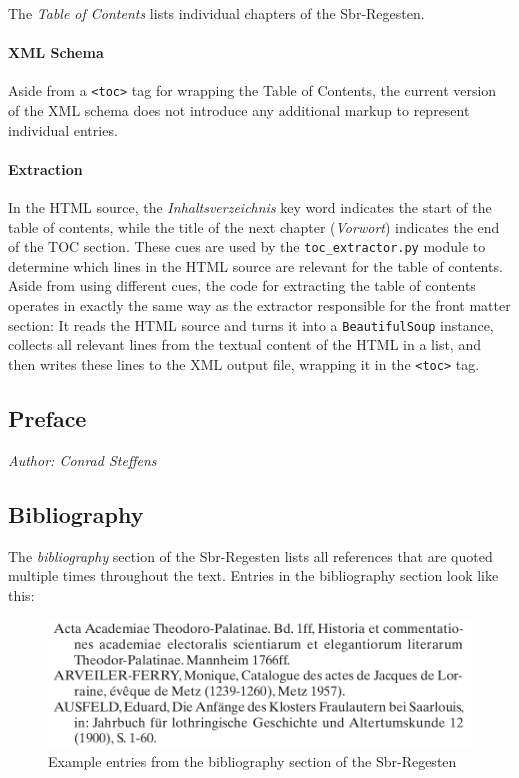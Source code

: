 The \emph{Table of Contents} lists individual chapters of the
Sbr-Regesten.

\paragraph{XML Schema}

Aside from a \texttt{<toc>} tag for wrapping the Table of Contents,
the current version of the XML schema does not introduce any
additional markup to represent individual entries.

\paragraph{Extraction}

In the HTML source, the \emph{Inhaltsverzeichnis} key word indicates
the start of the table of contents, while the title of the next
chapter (\emph{Vorwort}) indicates the end of the TOC section. These
cues are used by the \texttt{toc\_extractor.py} module to determine
which lines in the HTML source are relevant for the table of contents.
Aside from using different cues, the code for extracting the table of
contents operates in exactly the same way as the extractor responsible
for the front matter section: It reads the HTML source and turns it
into a \texttt{BeautifulSoup} instance, collects all relevant lines
from the textual content of the HTML in a list, and then writes these
lines to the XML output file, wrapping it in the \texttt{<toc>} tag.

\subsection{Preface}
\label{sec:preface}

\emph{Author: Conrad Steffens} \\

\subsection{Bibliography}
\label{sec:bibl}

The \emph{bibliography} section of the Sbr-Regesten lists all
references that are quoted multiple times throughout the text. Entries
in the bibliography section look like this:

\begin{figure}[h]
  \centering
  \includegraphics[scale=0.3]{img/bibl-entries}
  \caption{Example entries from the bibliography section of the Sbr-Regesten}
  \label{fig:bibl-entries}
\end{figure}

